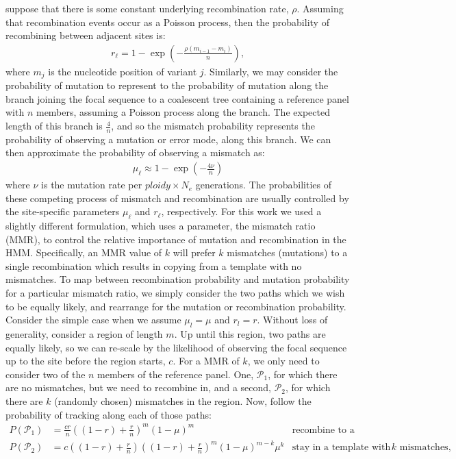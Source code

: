 \documentclass{article}
\begin{document}
suppose that there is some constant underlying recombination rate, $\rho$.
Assuming that recombination events occur as a Poisson process,
then the probability of recombining between adjacent sites is:
\begin{align*}
    r_\ell = 1 - \exp\left(-\frac{\rho\left(m_{i-1} - m_{i}\right)}{n}\right),
\end{align*}
where $m_j$ is the nucleotide position of variant $j$. Similarly, we may consider the probability of mutation to represent to the
probability of mutation along the branch joining the focal sequence to a coalescent
tree containing a reference panel with $n$ members, assuming a Poisson process
along the branch. The expected length of this branch is $\frac{4}{n}$, and so the mismatch
probability represents the probability of observing a mutation or error mode,
along this branch. We can then approximate the probability of observing a mismatch as:
\begin{align}
    \mu_\ell \approx 1 - \exp{\left(-\frac{4\nu}{n}\right)}
\end{align}
where $\nu$ is the mutation rate per $\mathit{ploidy} \times N_e$ generations. The probabilities of these competing process of mismatch and recombination are usually controlled by the site-specific parameters $\mu_\ell$ and $r_\ell$, respectively.
For this work we used a slightly different formulation, which uses a parameter, the mismatch ratio (MMR), to control the relative importance of mutation
and recombination in the HMM. Specifically, an MMR value of $k$ will
prefer $k$ mismatches (mutations) to a single recombination which results in copying from a template with no mismatches.
To map between recombination probability and mutation probability for a particular mismatch
ratio, we simply consider the two paths which we wish to be equally likely, and rearrange
for the mutation or recombination probability. Consider the simple case when we assume
$\mu_l=\mu$ and $r_l=r$. Without loss of generality, consider a region of length $m$. Up
until this region, two paths are equally likely, so we can re-scale by the likelihood of
observing the focal sequence up to the site before the region starts, $c$. For a MMR of $k$,
we only need to consider two of the $n$ members of the reference panel. One,
$\mathcal{P}_1$, for which there are no mismatches, but we need to recombine in, and a
second, $\mathcal{P}_2$, for which there are $k$ (randomly chosen) mismatches in the region.
Now, follow the probability of tracking along each of those paths:
\begin{align*}
P(\mathcal{P}_1) &= \frac{cr}{n} \left(\left(1-r\right)+\frac{r}{n}\right)^m\left(1-\mu\right)^m &\text{recombine to a template with no mismatches,}\\
P(\mathcal{P}_2) &= c \left(\left(1-r\right) + \frac{r}{n}\right)\left(\left(1-r\right)+\frac{r}{n}\right)^m \left(1-\mu\right)^{m-k}\mu^k &\text{stay in a template with $k$ mismatches,}
\end{align*}
\end{document}
